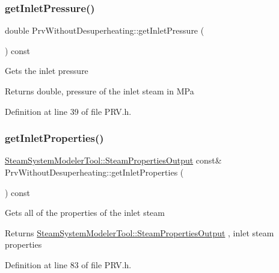\subsubsection{\texorpdfstring{get\+Inlet\+Pressure()}{getInletPressure()}\hspace{0.1cm}{\footnotesize\ttfamily [3/3]}}
{\footnotesize\ttfamily double Prv\+Without\+Desuperheating\+::get\+Inlet\+Pressure (\begin{DoxyParamCaption}{ }\end{DoxyParamCaption}) const\hspace{0.3cm}{\ttfamily [inline]}}

Gets the inlet pressure

\begin{DoxyReturn}{Returns}
double, pressure of the inlet steam in M\+Pa 
\end{DoxyReturn}


Definition at line 39 of file P\+R\+V.\+h.

\mbox{\label{class_prv_without_desuperheating_aefb61f9d9dd99216459f6948308d11e9}} 
\subsubsection{\texorpdfstring{get\+Inlet\+Properties()}{getInletProperties()}\hspace{0.1cm}{\footnotesize\ttfamily [1/3]}}
{\footnotesize\ttfamily \hyperlink{struct_steam_system_modeler_tool_1_1_steam_properties_output}{Steam\+System\+Modeler\+Tool\+::\+Steam\+Properties\+Output} const\& Prv\+Without\+Desuperheating\+::get\+Inlet\+Properties (\begin{DoxyParamCaption}{ }\end{DoxyParamCaption}) const\hspace{0.3cm}{\ttfamily [inline]}}

Gets all of the properties of the inlet steam \begin{DoxyReturn}{Returns}
\hyperlink{struct_steam_system_modeler_tool_1_1_steam_properties_output}{Steam\+System\+Modeler\+Tool\+::\+Steam\+Properties\+Output} , inlet steam properties 
\end{DoxyReturn}


Definition at line 83 of file P\+R\+V.\+h.

